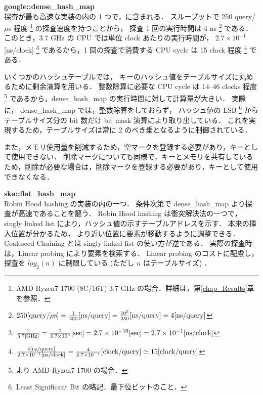{\bf google::dense\_hash\_map}
\samepage \\ \indent
探査が最も高速な実装の内の 1 つで，\cite{sparsehash2005}に含まれる．
スループットで 250 query/$\mu$s 程度
\footnote{AMD Ryzen7 1700 (8C/16T) 3.7 GHz の場合．詳細は，第\ref{chap_Results}章を参照．}
の探査速度を持つことから，
探査 1 回の実行時間は 4 ns
\footnote{
  $
    250{\rm [query \slash \mu s]}
    = \frac{1}{250} {\rm [\mu s \slash query]}
    = \frac{10^3}{250} {\rm [ns \slash query]}
    = 4 {\rm [ns \slash query]}
  $
}
である．このとき，3.7 GHz の CPU では単位 clock あたりの実行時間が，
$2.7 \times 10^{-1}$ [ns/clock]
\footnote{
  $
    \frac{1}{3.7 {\rm [GHz]}}
    = \frac{1}{3.7 \times 10^9}{\rm [sec]}
    = 2.7 \times 10^{-10}{\rm [sec]}
    = 2.7 \times 10^{-1}{\rm [ns/clock]}
  $
}
であるから，1 回の探査で消費する CPU cycle は
15 clock 程度
\footnote{
  $
    \frac{ 4 {\rm [ns/query]} }{ 2.7 \times 10^{-1} {\rm [ns/clock]} }
    = \frac{ 4 }{ 2.7 \times 10^{-1} } {\rm [clock/query]}
    \simeq 15 {\rm [clock/query]}
  $
}
である．

いくつかのハッシュテーブルでは，
キーのハッシュ値をテーブルサイズに丸めるために剰余演算を用いる．
整数除算に必要な CPU cycle は 14--46 clocks 程度
\footnote{
  \cite{AgnerFog2018}より AMD Ryzen7 1700 の場合．
}
であるから，dense\_hash\_map の実行時間に対して計算量が大きい．
実際に，
dense\_hash\_map では，整数除算をしておらず，
ハッシュ値の LSB \footnote{Least Significant Bit の略記．最下位ビットのこと．} から
テーブルサイズ分の bit 数だけ bit mask 演算により取り出している．
これを実現するため，テーブルサイズは常に 2 のべき乗となるように制御されている．

また，メモリ使用量を削減するため，空マークを登録する必要があり，キーとして使用できない．
削除マークについても同様で，キーとメモリを共有しているため，削除が必要な場合は，削除マークを登録する必要があり，キーとして使用できなくなる．

{\bf ska::flat\_hash\_map}
\samepage \\ \indent
Robin Hood hashing の実装の内の一つ．
条件次第で dense\_hash\_map より探査が高速であることを謳う．
Robin Hood hashing は衝突解決法の一つで，
singly linked list により，ハッシュ値の示すテーブルアドレスを示す．
本来の挿入位置が分かるため，
より近い位置に要素が移動するように調整できる．
Coalesced Chaining とは singly linked list の使い方が逆である．
実際の探査時は，Linear probing により要素を検索する．
Linear probing のコストに配慮し，
探査を $log_2(n)$ に制限している (ただし $n$ はテーブルサイズ) \citep{Skarupke2017}．

